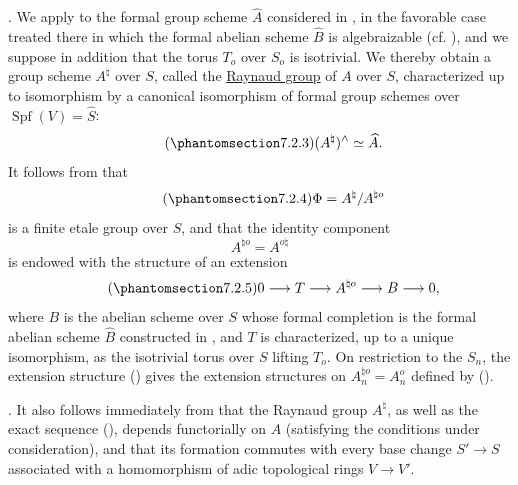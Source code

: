 
\medskip
\noindent
{}. We apply  to the formal group scheme $\widehat A$
considered in , in the favorable case treated there in which the
formal abelian scheme $\widehat B$ is algebraizable (cf. ), and
we suppose in addition that the torus $T_o$ over $S_o$ is isotrivial.
We thereby obtain a group scheme $A^\natural$ over $S$, called the
\underline{Raynaud group} of $A$ over $S$, characterized up to
isomorphism by a canonical isomorphism of formal group schemes over
$\operatorname{Spf}(V)=\widehat S$:
\begin{equation}\tag{\SGARefTarget{sga7.sga7i.eix.n7-2-3}{7.2.3}}
 (A^\natural)^\wedge\simeq\widehat A.
\end{equation}
It follows from  that
\begin{equation}\tag{\SGARefTarget{sga7.sga7i.eix.n7-2-4}{7.2.4}}
 \Phi=A^\natural/A^{\natural o}
\end{equation}
is a finite etale group over $S$, and that the identity component
\[
 A^{\natural o}=A^{o\natural}
\]
is endowed with the structure of an extension
\begin{equation}\tag{\SGARefTarget{sga7.sga7i.eix.n7-2-5}{7.2.5}}
 0\longrightarrow T\longrightarrow A^{\natural o}
 \longrightarrow B\longrightarrow0,
\end{equation}
where $B$ is the abelian scheme over $S$ whose formal completion is
the formal abelian scheme $\widehat B$ constructed in , and $T$ is
characterized, up to a unique isomorphism, as the isotrivial torus
over $S$ lifting $T_o$.  On restriction to the $S_n$, the extension
structure () gives the extension structures on
$A_n^{\natural o}=A_n^o$ defined by ().

\medskip
\noindent
{}. It also follows immediately from  that the Raynaud group
$A^\natural$, as well as the exact sequence (), depends
functorially on $A$ (satisfying the conditions under consideration),
and that its formation commutes with every base change
$S'\longrightarrow S$ associated with a homomorphism of adic
topological rings $V\longrightarrow V'$.
